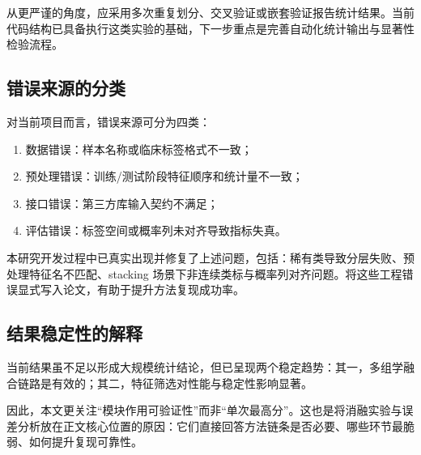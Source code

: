 从更严谨的角度，应采用多次重复划分、交叉验证或嵌套验证报告统计结果。当前代码结构已具备执行这类实验的基础，下一步重点是完善自动化统计输出与显著性检验流程。

\subsection{错误来源的分类}

对当前项目而言，错误来源可分为四类：
\begin{enumerate}
  \item 数据错误：样本名称或临床标签格式不一致；
  \item 预处理错误：训练/测试阶段特征顺序和统计量不一致；
  \item 接口错误：第三方库输入契约不满足；
  \item 评估错误：标签空间或概率列未对齐导致指标失真。
\end{enumerate}

本研究开发过程中已真实出现并修复了上述问题，包括：稀有类导致分层失败、预处理特征名不匹配、stacking 场景下非连续类标与概率列对齐问题。将这些工程错误显式写入论文，有助于提升方法复现成功率。

\subsection{结果稳定性的解释}

当前结果虽不足以形成大规模统计结论，但已呈现两个稳定趋势：其一，多组学融合链路是有效的；其二，特征筛选对性能与稳定性影响显著。

因此，本文更关注“模块作用可验证性”而非“单次最高分”。这也是将消融实验与误差分析放在正文核心位置的原因：它们直接回答方法链条是否必要、哪些环节最脆弱、如何提升复现可靠性。
